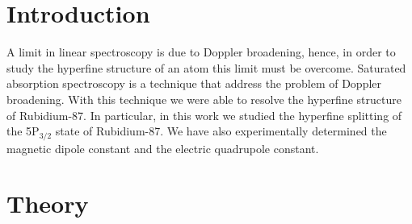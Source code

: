 \documentclass[a4paper,10pt]{article}
\begin{document}
\section{Introduction}
A limit in linear spectroscopy is due to Doppler broadening, hence, in order to study the hyperfine structure of an atom this limit must be overcome. Saturated absorption spectroscopy is a technique that address the problem of Doppler broadening. With this technique we were able to resolve the hyperfine structure of Rubidium-87. In particular, in this work we studied the hyperfine splitting of the 5P$_{3/2}$ state of Rubidium-87. We have also experimentally determined the magnetic dipole constant and the electric quadrupole constant.
\section{Theory}
\end{document}
